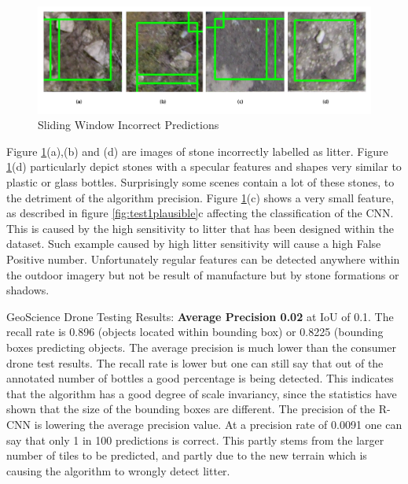 \documentclass{IEEEtran}
\begin{document}
\begin{enumerate}
\begin{figure}[H]
\centering
\includegraphics[scale=0.4]{images/test1-unkown.png}
\caption{Sliding Window Incorrect Predictions}
\label{figcorrectable2}
\end{figure}

Figure \ref{figcorrectable2}(a),(b) and (d) are images of stone incorrectly labelled as litter. Figure \ref{figcorrectable2}(d) particularly depict stones with a specular features and shapes very similar to plastic or glass bottles. Surprisingly some scenes contain a lot of these stones, to the detriment of the algorithm precision. Figure \ref{figcorrectable2}(c) shows a very small feature, as described  in figure \ref{fig:test1plausible}c affecting the classification of the CNN. This is caused by the high sensitivity to litter that has been designed within the dataset. Such example caused by high litter sensitivity will cause a high False Positive number. Unfortunately regular features can be detected anywhere within the outdoor imagery but not be result of manufacture but by stone formations or shadows. \newline
\end{enumerate}


GeoScience Drone Testing Results: \textbf{Average Precision 0.02} at IoU of 0.1. The recall rate is 0.896 (objects located within bounding box) or 0.8225 (bounding boxes predicting objects. The average precision is much lower than the consumer drone test results. The recall rate is lower but one can still say that out of the annotated number of bottles a good percentage is being detected. This indicates that the algorithm has a good degree of scale invariancy, since the statistics have shown that the size of the bounding boxes are different. The precision of the R-CNN is lowering the average precision value. At a precision rate of 0.0091 one can say that only 1 in 100 predictions is correct. This partly stems from the larger number of tiles to be predicted, and partly due to the new terrain which is causing the algorithm to wrongly detect litter.\newline 
\end{document}
